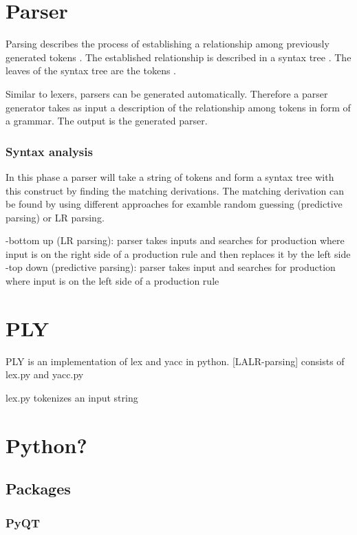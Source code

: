 



\section{Parser}\label{sec:BackgroundParser}

Parsing describes the process of establishing a relationship among previously generated tokens \cite{LexYacc.1992}.
The established relationship is described in a syntax tree \cite{Mogensen.2017}. The leaves of the syntax tree are the tokens \cite{Mogensen.2017}.

Similar to lexers, parsers can be generated automatically.
Therefore a parser generator takes as input a description of the relationship among tokens in form of a grammar. The output is the generated parser. \cite{LexYacc.1992}
 
\subsubsection{Syntax analysis}

In this phase a parser will take a string of tokens and form a syntax tree with this construct by finding the matching derivations. The matching derivation can be found by using different approaches for examble random guessing (predictive parsing) or LR parsing.

-bottom up (LR parsing):
parser takes inputs and searches for production where input is on the right side of a production rule and then replaces it by the left side
-top down (predictive parsing):
parser takes input and searches for production where input is on the left side of a production rule


\section{PLY}\label{sec:BackgroundPLY}

\acf{PLY} \cite{PLY} is an implementation of lex and yacc in python.
[LALR-parsing]
consists of lex.py and yacc.py

lex.py tokenizes an input string


\section{Python?}\label{sec:BackgroundPython}
\subsection{Packages}\label{sec:BackgroundPackages}
\subsubsection{PyQT}\label{sec:BackgroundPyQT}